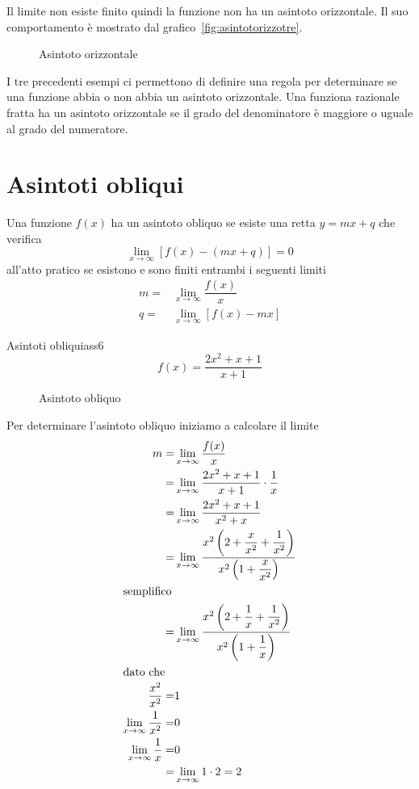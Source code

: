 Il limite non esiste  finito quindi la funzione non ha un asintoto orizzontale. Il suo comportamento è mostrato dal grafico~\vref{fig:asintotorizzotre}.
\begin{figure}
	\centering
	
	\captionsetup{format=grafico}
	\caption[Asintoto orizzontale]{Asintoto orizzontale}
	\label{fig:asintotorizzotre}
\end{figure}

I tre precedenti esempi ci permettono di definire una regola per determinare se una funzione abbia o non abbia un asintoto orizzontale. Una funziona razionale fratta ha un asintoto orizzontale se il grado del denominatore è maggiore o uguale al grado del numeratore. 
\section{Asintoti obliqui}
Una funzione $f(x)$ ha un asintoto obliquo se esiste una retta $y=mx+q$ che verifica \[\lim_{x\to \infty}[f(x)-(mx+q)]=0 \]
all'atto pratico se esistono e sono finiti entrambi i seguenti limiti
\begin{align*}
m=&\lim_{x\to \infty}\dfrac{f(x)}{x}\\
q=&\lim_{x\to \infty}[f(x)-mx]
\end{align*}
\begin{esempiot}{Asintoti obliqui}{ass6}
	\[f(x)=\dfrac{2x^2+x+1}{x+1}\]
\end{esempiot}
\begin{figure}
	\centering
	
	\captionsetup{format=grafico}
	\caption[Asintoto obliquo]{Asintoto obliquo}
	\label{fig:asintoobliquouno}
\end{figure}
Per determinare l'asintoto obliquo iniziamo a calcolare il limite
\begin{align*}
m=&\lim_{x\to \infty}\dfrac{f(x)}{x}\\
=&\lim_{x\to \infty}\dfrac{2x^2+x+1}{x+1}\cdot\dfrac{1}{x}\\
=&\lim_{x\to \infty}\dfrac{2x^2+x+1}{x^2+x}\\
=&\lim_{x\to \infty}\dfrac{x^2\left(2+\dfrac{x}{x^2}+\dfrac{1}{x^2}\right)}{x^2\left(1+\dfrac{x}{x^2}\right)}\\
\intertext{semplifico}
=&\lim_{x\to \infty}\dfrac{x^2\left(2+\dfrac{1}{x}+\dfrac{1}{x^2}\right)}{x^2\left(1+\dfrac{1}{x}\right)}\\
\intertext{dato che}
\dfrac{x^2}{x^2}=&1\\
\lim_{x\to \infty}\dfrac{1}{x^2}=&0\\
\lim_{x\to \infty}\dfrac{1}{x}=&0\\
=&\lim_{x\to \infty}1\cdot 2=2
\end{align*} 
